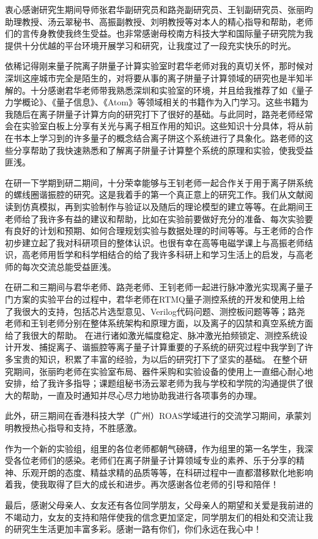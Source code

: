 
\begin{acknowledgements}
  衷心感谢研究生期间导师张君华副研究员和路尧副研究员、王钊副研究员、张丽昀助理教授、汤云翠秘书、高振副教授、刘明教授等对本人的精心指导和帮助，老师们的言传身教使我终生受益。也非常感谢母校南方科技大学和国际量子研究院为我提供十分优越的平台环境开展学习和研究，让我度过了一段充实快乐的时光。

  依稀记得刚来量子院离子阱量子计算实验室时君华老师对我的真切关怀，那时候对深圳这座城市完全是陌生的，对将要从事的离子阱量子计算领域的研究也是半知半解的。十分感谢君华老师带我熟悉深圳和实验室的环境，并且给我推荐了如《量子力学概论》、《量子信息》、《Atom》等领域相关的书籍作为入门学习。这些书籍为我随后在离子阱量子计算方向的研究打下了很好的基础。与此同时，路尧老师经常会在实验室白板上分享有关光与离子相互作用的知识。这些知识十分具体，将从前在书本上学习到的许多量子的概念结合离子阱这个系统进行了具象化。路老师的这些分享帮助了我快速熟悉和了解离子阱量子计算整个系统的原理和实验，使我受益匪浅。
  
  在研一下学期到研二期间，十分荣幸能够与王钊老师一起合作关于用于离子阱系统的螺线圈谐振腔的研究。这是我着手的第一个真正意上的研究工作。我们从文献阅读到仿真模拟，再到实验制作与验证以及随后的理论模型的建立等等。在此期间王老师给了我许多有益的建议和帮助，比如在实验前要做好充分的准备、每次实验要有良好的计划和预期、如何合理规划实验与数据处理的时间等等。与王老师的合作初步建立起了我对科研项目的整体认识。也很有幸在高等电磁学课上与高振老师结识，高老师用哲学和科学相结合的给了我许多科研上和学习生活上的启发，与高老师的每次交流总能受益匪浅。
  
  在研二和三期间与君华老师、路尧老师、王钊老师一起进行脉冲激光实现离子量子门方案的实验平台的过程中，君华老师在RTMQ量子测控系统的开发和使用上给了我很大的支持，包括芯片选型意见、Verilog代码问题、测控板问题等等；路尧老师和王钊老师分别在整体系统架构和原理方面，以及离子的囚禁和真空系统方面给了我很大的帮助。
  在进行诸如激光幅度稳定、脉冲激光拍频锁定、测控系统设计开发、捕捉离子、谐振腔等离子量子计算重要的子系统的研究过程中我学到了许多宝贵的知识，积累了丰富的经验，为以后的研究打下了坚实的基础。
  在整个研究期间，张丽昀老师在实验室布局、器件采购和实验设备的使用上一直细心耐心地安排，给了我许多指导；课题组秘书汤云翠老师为我与学校和学院的沟通提供了很大的帮助，一直及时通知并尽心尽力地协助我进行各项事务的办理。
  
  此外，研三期间在香港科技大学（广州）ROAS学域进行的交流学习期间，承蒙刘明教授热心指导和支持，不胜感激。
  
  作为一个新的实验组，组里的各位老师都朝气磅礴，作为组里的第一名学生，我深受各位老师们的感染。老师们在离子阱量子计算领域专业的素养、乐于分享的精神、乐观开朗的态度、精益求精的品质等等，在科研过程中一直都潜移默化地影响着我，使我取得了巨大的成长和进步。再次感谢各位老师的引导和陪伴！

  最后，感谢父母亲人、女友还有各位同学朋友，父母亲人的期望和关爱是我前进的不竭动力，女友的支持和陪伴使我的信念更加坚定，同学朋友们的相处和交流让我的研究生生活更加丰富多彩。感谢一路有你们，你们永远在我心中！

\end{acknowledgements}
